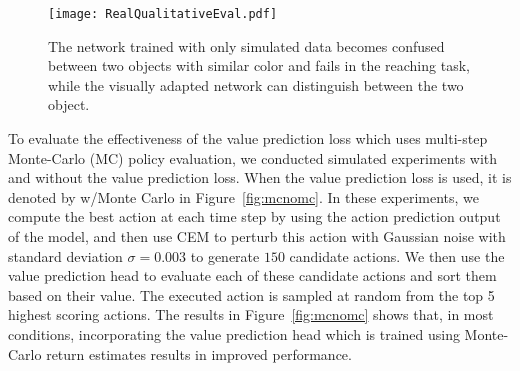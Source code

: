\documentclass[10pt,twocolumn,letterpaper]{article}
\begin{document}
\begin{figure}[t]
\begin{center}
\texttt{[image: RealQualitativeEval.pdf]}
\end{center}
\vspace{-.15in}
   \caption{The network trained with only simulated data becomes confused between two objects with similar color and fails in the reaching task, while the visually adapted network can distinguish between the two object.}
\label{fig:realqual}
\vspace{-.2in}
\end{figure}
To evaluate the effectiveness of the value prediction loss which uses multi-step Monte-Carlo (MC) policy evaluation, we conducted simulated experiments with and without the value prediction loss. When the value prediction loss is used, it is  denoted by w/Monte Carlo in Figure~\ref{fig:mcnomc}. In these experiments, we compute the best action at each time step by using the action prediction output of the model, and then use CEM to perturb this action with Gaussian noise with standard deviation $\sigma=0.003$ to generate $150$ candidate actions. We then use the value prediction head to evaluate each of these candidate actions and sort them based on their value. The executed action is sampled at random from the top 5 highest scoring actions.
The results in Figure~\ref{fig:mcnomc} shows that, in most conditions, incorporating the value prediction head which is trained using Monte-Carlo return estimates results in improved performance.
\end{document}
